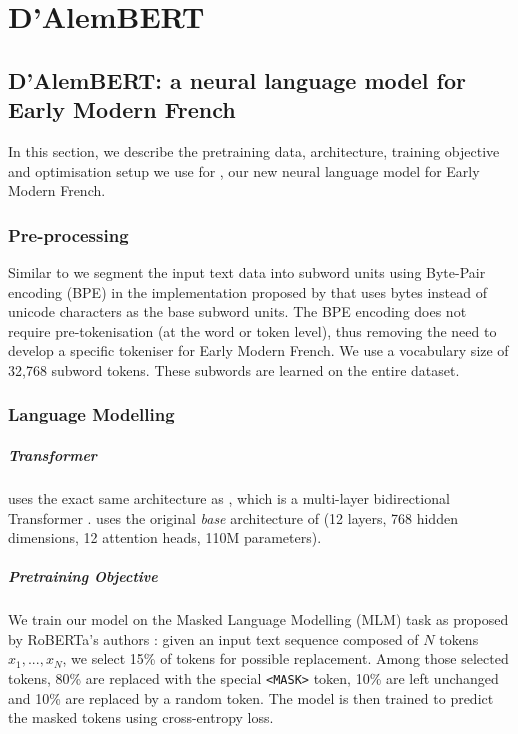 \chapter{D'AlemBERT}\label{chap:dalembert}



\section{D'AlemBERT: a neural language model for Early Modern French}\label{sec:dAlemBERT}
In this section, we describe the pretraining data, architecture, training objective and optimisation setup we use for \dalembert, our new neural language model for Early Modern French.


\subsection{Pre-processing}
Similar to \roberta \cite{liu-etal-2019-roberta} we segment the input text data into subword units using Byte-Pair encoding (BPE) \cite{sennrich-etal-2016-neural} in the implementation proposed by \cite{radford-etal-2019-language} that uses bytes instead of unicode characters as the base subword units. The BPE encoding does not require pre-tokenisation (at the word or token level), thus removing the need to develop a specific tokeniser for Early Modern French. We use a vocabulary size of 32,768 subword tokens. These subwords are learned on the entire \freemmax dataset.


\subsection{Language Modelling}

\paragraph{Transformer}
\dalembert uses the exact same architecture as \roberta, which is a multi-layer bidirectional Transformer \cite{vaswani-etal-2017-attention}.
\dalembert uses the original \emph{base} architecture of \roberta (12 layers, 768 hidden dimensions, 12 attention heads, 110M parameters).

\paragraph{Pretraining Objective}
We train our model on the Masked Language Modelling (MLM) task as proposed by RoBERTa's authors \cite{liu-etal-2019-roberta}: given an input text sequence composed of $N$ tokens $x_1, ..., x_N$, we select 15\% of tokens for possible replacement. Among those selected tokens, 80\% are replaced with the special \texttt{<MASK>} token, 10\% are left unchanged and 10\% are replaced by a random token. The model is then trained to predict the masked tokens using cross-entropy loss.

